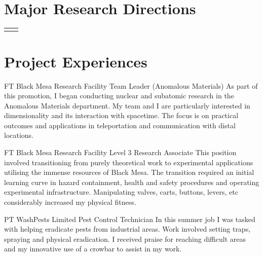 \documentclass[10pt]{article} %
\begin{document}
\begin{paracol}{2}
\section{Major Research Directions}
	\begin{supertabular}{rl}
	\end{supertabular}

\section{Project Experiences}





{FT} %
{Black Mesa Research Facility} %
{Team Leader (Anomalous Materials)} %
{As part of this promotion, I began conducting nuclear and subatomic research in the Anomalous Materials department. My team and I are particularly interested in dimensionality and its interaction with spacetime. The focus is on practical outcomes and applications in teleportation and communication with distal locations.} %


{FT} %
{Black Mesa Research Facility} %
{Level 3 Research Associate} %
{This position involved transitioning from purely theoretical work to experimental applications utilising the immense resources of Black Mesa. The transition required an initial learning curve in hazard containment, health and safety procedures and operating experimental infrastructure. Manipulating valves, carts, buttons, levers, etc considerably increased my physical fitness.}  %


{PT} %
{WashPests Limited} %
{Pest Control Technician} %
{In this summer job I was tasked with helping eradicate pests from industrial areas. Work involved setting traps, spraying and physical eradication. I received praise for reaching difficult areas and my innovative use of a crowbar to assist in my work.} %


\end{paracol}
\end{document}
